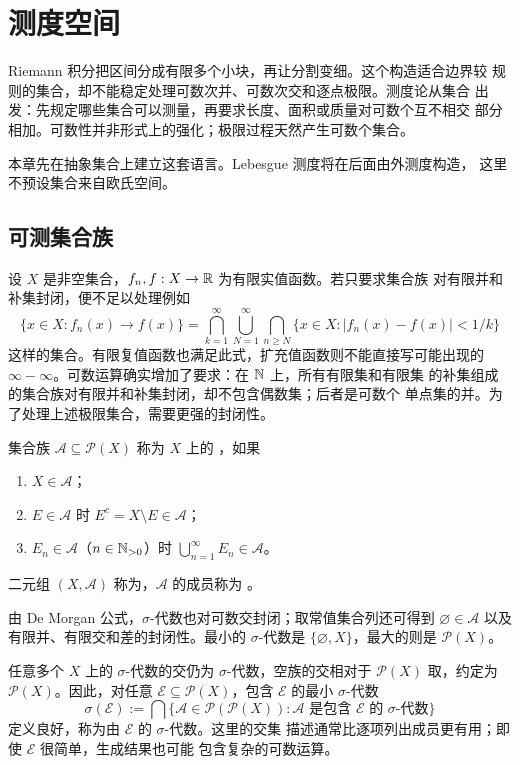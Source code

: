 \chapter{测度空间}
\label{chap:measure-spaces}

Riemann 积分把区间分成有限多个小块，再让分割变细。这个构造适合边界较
规则的集合，却不能稳定处理可数次并、可数次交和逐点极限。测度论从集合
出发：先规定哪些集合可以测量，再要求长度、面积或质量对可数个互不相交
部分相加。可数性并非形式上的强化；极限过程天然产生可数个集合。

本章先在抽象集合上建立这套语言。Lebesgue 测度将在后面由外测度构造，
这里不预设集合来自欧氏空间。

\section{可测集合族}

设 $X$ 是非空集合，$f_n,f:X\to\mathbb{R}$ 为有限实值函数。若只要求集合族
对有限并和补集封闭，便不足以处理例如
\[
 \{x\in X:f_n(x)\to f(x)\}
 =\bigcap_{k=1}^{\infty}\bigcup_{N=1}^{\infty}
   \bigcap_{n\ge N}\{x\in X:|f_n(x)-f(x)|<1/k\}
\]
这样的集合。有限复值函数也满足此式，扩充值函数则不能直接写可能出现的
$\infty-\infty$。可数运算确实增加了要求：在 $\mathbb{N}$ 上，所有有限集和有限集
的补集组成的集合族对有限并和补集封闭，却不包含偶数集；后者是可数个
单点集的并。为了处理上述极限集合，需要更强的封闭性。

\begin{definition}
集合族 $\mathcal A\subseteq\mathcal P(X)$ 称为 $X$ 上的
，如果
\begin{enumerate}[label=\textup{(\roman*)}]
 \item $X\in\mathcal A$；
 \item $E\in\mathcal A$ 时 $E^c=X\setminus E\in\mathcal A$；
 \item $E_n\in\mathcal A$（$n\in\mathbb{N}_{>0}$）时
       $\bigcup_{n=1}^{\infty}E_n\in\mathcal A$。
\end{enumerate}
二元组 $(X,\mathcal A)$ 称为，$\mathcal A$ 的成员称为
。
\end{definition}

由 De Morgan 公式，$\sigma$-代数也对可数交封闭；取常值集合列还可得到
$\varnothing\in\mathcal A$ 以及有限并、有限交和差的封闭性。最小的
$\sigma$-代数是 $\{\varnothing,X\}$，最大的则是 $\mathcal P(X)$。

任意多个 $X$ 上的 $\sigma$-代数的交仍为 $\sigma$-代数，空族的交相对于
$\mathcal P(X)$ 取，约定为 $\mathcal P(X)$。因此，对任意
$\mathcal E\subseteq\mathcal P(X)$，包含 $\mathcal E$ 的最小
$\sigma$-代数
\[
 \sigma(\mathcal E)
 :=\bigcap\{\mathcal A\in\mathcal P(\mathcal P(X)):\mathcal A\text{ 是包含 }\mathcal E
 \text{ 的 }\sigma\text{-代数}\}
\]
定义良好，称为由 $\mathcal E$ 的 $\sigma$-代数。这里的交集
描述通常比逐项列出成员更有用；即使 $\mathcal E$ 很简单，生成结果也可能
包含复杂的可数运算。

